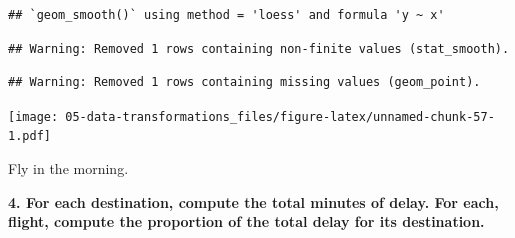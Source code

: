 \documentclass[]{book}
\newenvironment{Shaded}{\begin{snugshade}}{\end{snugshade}}
\newcommand{\DataTypeTok}[1]{\textcolor[rgb]{0.13,0.29,0.53}{#1}}
\newcommand{\KeywordTok}[1]{\textcolor[rgb]{0.13,0.29,0.53}{\textbf{#1}}}
\newcommand{\NormalTok}[1]{#1}
\newcommand{\OperatorTok}[1]{\textcolor[rgb]{0.81,0.36,0.00}{\textbf{#1}}}
\newcommand{\OtherTok}[1]{\textcolor[rgb]{0.56,0.35,0.01}{#1}}
\newcommand{\StringTok}[1]{\textcolor[rgb]{0.31,0.60,0.02}{#1}}
\theoremstyle{definition}
\theoremstyle{definition}
\theoremstyle{definition}
\theoremstyle{remark}
\begin{document}
\begin{Shaded}
\end{Shaded}

\begin{verbatim}
## `geom_smooth()` using method = 'loess' and formula 'y ~ x'
\end{verbatim}

\begin{verbatim}
## Warning: Removed 1 rows containing non-finite values (stat_smooth).
\end{verbatim}

\begin{verbatim}
## Warning: Removed 1 rows containing missing values (geom_point).
\end{verbatim}

\texttt{[image: 05-data-transformations\_files/figure-latex/unnamed-chunk-57-1.pdf]}

Fly in the morning.

\textbf{4. For each destination, compute the total minutes of delay. For
each, flight, compute the proportion of the total delay for its
destination.}

\begin{Shaded}
\end{Shaded}
\end{document}
